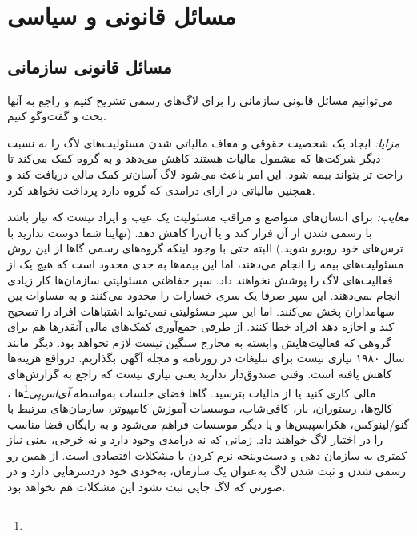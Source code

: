 \section{مسائل قانونی و سیاسی}

\subsection{مسائل قانونی سازمانی}

می‌توانیم مسائل قانونی سازمانی را برای لاگ‌های رسمی تشریح کنیم و راجع
به آنها بحث و گفت‌وگو کنیم.

{\itshape مزایا:}
ایجاد یک شخصیت حقوقی و معاف مالیاتی شدن مسئولیت‌های لاگ
را به نسبت دیگر شرکت‌ها که مشمول مالیات هستند کاهش می‌دهد و به گروه
کمک می‌کند تا راحت تر بتواند بیمه شود. این امر باعث می‌شود لاگ آسان‌تر
کمک مالی دریافت کند و همچنین مالیاتی در ازای درامدی که گروه دارد
پرداخت نخواهد کرد.

{\itshape معایب:}
برای انسان‌های متواضع و مراقب مسئولیت یک عیب و ایراد نیست که نیاز باشد
با رسمی شدن از آن فرار کند و یا آن‌را کاهش دهد.
(نهایتا شما دوست ندارید با ترس‌های خود روبرو شوید.)
البته حتی با وجود اینکه گروه‌های رسمی گاها از این روش مسئولیت‌های بیمه
را انجام می‌دهند، اما این بیمه‌ها به حدی محدود است که هیچ یک از فعالیت‌های
لاگ را پوشش نخواهند داد.
سپر حفاظتی مسئولیتی سازمان‌ها کار زیادی انجام نمی‌دهند. این سپر صرفا
یک سری خسارات را محدود می‌کنند و به مساوات بین سهامداران پخش می‌کنند.
اما این سپر مسئولیتی نمی‌تواند اشتباهات افراد را تصحیح کند و اجازه دهد
افراد خطا کنند.
از طرفی جمع‌آوری کمک‌های مالی آنقدر‌ها هم برای گروهی که فعالیت‌هایش وابسته به
مخارج سنگین نیست لازم نخواهد بود. دیگر مانند سال ۱۹۸۰ نیازی نیست برای تبلیغات
در روزنامه و مجله آگهی بگذاریم. درواقع هزینه‌ها کاهش یافته است.
وقتی صندوق‌دار ندارید یعنی نیازی نیست که راجع به گزارش‌های مالی کاری کنید یا
از مالیات بترسید.
گاها فضای جلسات به‌واسطه
\emph{آی‌اس‌پی}\footnote{}ها
، کالج‌ها، رستوران، بار، کافی‌شاپ، موسسات آموزش کامپیوتر،
سازمان‌های مرتبط با گنو/لینوکس، هکراسپیس‌ها و یا دیگر موسسات فراهم می‌شود و به رایگان
فضا مناسب را در اختیار لاگ خواهند داد.
زمانی که نه درامدی وجود دارد و نه خرجی، یعنی نیاز کمتری به سازمان دهی و دست‌وپنجه
نرم کردن با مشکلات اقتصادی است.
از همین رو رسمی شدن و ثبت شدن لاگ به‌عنوان یک سازمان، به‌خودی خود دردسر‌هایی دارد
و در صورتی که لاگ جایی ثبت نشود این مشکلات هم نخواهد بود.

